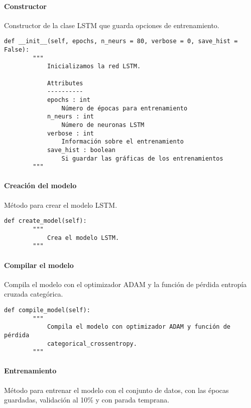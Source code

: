 \paragraph{Constructor}

Constructor de la clase LSTM que guarda opciones de entrenamiento.

\begin{lstlisting}
def __init__(self, epochs, n_neurs = 80, verbose = 0, save_hist = False):
        """
            Inicializamos la red LSTM.

            Attributes
            ----------
            epochs : int
                Número de épocas para entrenamiento
            n_neurs : int
                Número de neuronas LSTM
            verbose : int
                Información sobre el entrenamiento
            save_hist : boolean
                Si guardar las gráficas de los entrenamientos
        """
\end{lstlisting}

\paragraph{Creación del modelo}

Método para crear el modelo LSTM.

\begin{lstlisting}
def create_model(self):
        """
            Crea el modelo LSTM.
        """
\end{lstlisting}

\paragraph{Compilar el modelo}

Compila el modelo con el optimizador ADAM y la función de pérdida entropía cruzada categórica.

\begin{lstlisting}
def compile_model(self):
        """
            Compila el modelo con optimizador ADAM y función de pérdida
            categorical_crossentropy.
        """
\end{lstlisting}

\paragraph{Entrenamiento}

Método para entrenar el modelo con el conjunto de datos, con las épocas guardadas, validación al 10\% y con parada temprana.

